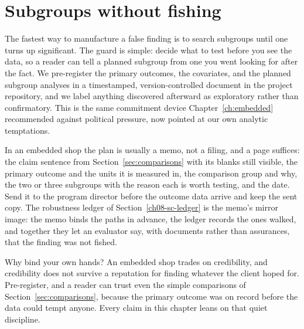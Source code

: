 \section{Subgroups without fishing}\label{sec:prereg}
The fastest way to manufacture a false finding is to search subgroups until one turns up significant. The guard is simple: decide what to test before you see the data, so a reader can tell a planned subgroup from one you went looking for after the fact. We pre-register the primary outcomes, the covariates, and the planned subgroup analyses in a timestamped, version-controlled document in the project repository, and we label anything discovered afterward as exploratory rather than confirmatory. This is the same commitment device Chapter~\ref{ch:embedded} recommended against political pressure, now pointed at our own analytic temptations.

In an embedded shop the plan is usually a memo, not a filing, and a page suffices: the claim sentence from Section~\ref{sec:comparisons} with its blanks still visible, the primary outcome and the units it is measured in, the comparison group and why, the two or three subgroups with the reason each is worth testing, and the date. Send it to the program director before the outcome data arrive and keep the sent copy. The robustness ledger of Section~\ref{ch08-sc-ledger} is the memo's mirror image: the memo binds the paths in advance, the ledger records the ones walked, and together they let an evaluator say, with documents rather than assurances, that the finding was not fished.

Why bind your own hands? An embedded shop trades on credibility, and credibility does not survive a reputation for finding whatever the client hoped for. Pre-register, and a reader can trust even the simple comparisons of Section~\ref{sec:comparisons}, because the primary outcome was on record before the data could tempt anyone. Every claim in this chapter leans on that quiet discipline.


